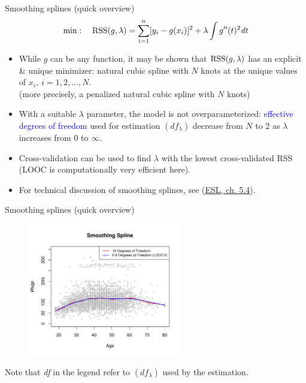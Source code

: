 \documentclass{beamer}
\begin{document}
\begin{frame}{Smoothing splines (quick overview)}
$$\min:~~~\textnormal{RSS}(g,\lambda) = \sum_{i=1}^n [y_i - g(x_i)]^2 + \lambda \int g''(t)^2 \textit{dt}$$
\begin{itemize}
    \item While $g$ can be any function, it may be shown that $\textnormal{RSS}(g,\lambda)$ has an explicit \& unique minimizer: natural cubic spline with $N$ knots at the unique values of $x_i,~i=1,2,\dots,N$. \\(more precisely, a penalized natural cubic spline with $N$ knots)
    \medskip
    \item With a suitable $\lambda$ parameter, the model is not overparameterized: \textcolor{blue}{effective degrees of freedom} used for estimation $(df_{\lambda})$ decrease from $N$ to 2 as $\lambda$ increases from 0 to $\infty$.
    \medskip
    \item Cross-validation can be used to find $\lambda$ with the lowest cross-validated RSS (LOOC is computationally very efficient here).
    \vspace{-0.3cm}
    \item For technical discussion of smoothing splines, see (\textcolor{blue}{\underline{\href{https://web.stanford.edu/~hastie/ElemStatLearn/}{ESL, ch. 5.4}}}).
\end{itemize}
\end{frame}
\begin{frame}{Smoothing splines (quick overview)}
\vspace{-0.4cm}
\begin{figure}
  \centering
  \includegraphics[trim=0cm 0cm 0cm 1cm, clip=true, width=0.6\textwidth]{IMG/ISLR78.pdf}
\end{figure}
\centering
\vspace{-0.5cm}
\tiny{Note that \textit{df} in the legend refer to $(df_{\lambda})$ used by the estimation.}
\end{frame}
\end{document}
